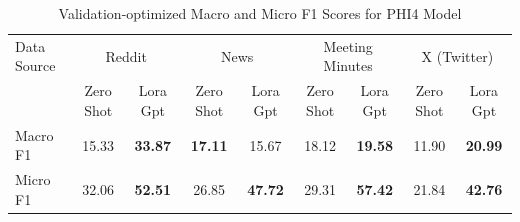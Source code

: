 \begin{table}[htbp]
\centering
\begin{tabular}{l *{8}{c}}
\toprule
Data Source & \multicolumn{2}{c}{Reddit} & \multicolumn{2}{c}{News} & \multicolumn{2}{c}{Meeting Minutes} & \multicolumn{2}{c}{X (Twitter)} \\
& Zero Shot & Lora Gpt & Zero Shot & Lora Gpt & Zero Shot & Lora Gpt & Zero Shot & Lora Gpt \\
\midrule
Macro F1 & 15.33 & \textbf{33.87} & \textbf{17.11} & 15.67 & 18.12 & \textbf{19.58} & 11.90 & \textbf{20.99} \\
Micro F1 & 32.06 & \textbf{52.51} & 26.85 & \textbf{47.72} & 29.31 & \textbf{57.42} & 21.84 & \textbf{42.76} \\
\bottomrule
\end{tabular}
\centering\caption{Validation-optimized Macro and Micro F1 Scores for PHI4 Model}
\label{tab:phi4_macro_micro}
\end{table}